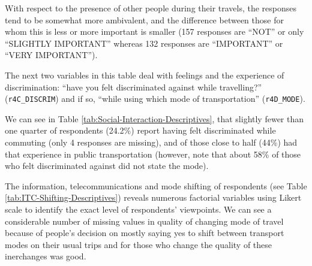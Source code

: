 \documentclass[
11pt, %
oneside, %
english, %
singlespacing, %
]{macthesis} %
\begin{document}
With respect to the presence of other people during their travels, the responses tend to be somewhat more ambivalent, and the difference between those for whom this is less or more important is smaller (157 responses are ``NOT'' or only ``SLIGHTLY IMPORTANT'' whereas 132 responses are ``IMPORTANT'' or ``VERY IMPORTANT'').

The next two variables in this table deal with feelings and the experience of discrimination: ``have you felt discriminated against while travelling?'' (\texttt{r4C\_DISCRIM}) and if so, ``while using which mode of transportation'' (\texttt{r4D\_MODE}).

We can see in Table \ref{tab:Social-Interaction-Descriptives}, that slightly fewer than one quarter of respondents (24.2\%) report having felt discriminated while commuting (only 4 responses are missing), and of those close to half (44\%) had that experience in public transportation (however, note that about 58\% of those who felt discriminated against did not state the mode).
\begin{table}

\caption{\label{tab:unnamed-chunk-11}\label{tab:Social-Interaction-Descriptives}Variables regarding social interactions of respondents}
\centering
{}
\end{table}
The information, telecommunications and mode shifting of respondents (see Table \ref{tab:ITC-Shifting-Descriptives}) reveals numerous factorial variables using Likert scale to identify the exact level of respondents' viewpoints. We can see a considerable number of missing values in quality of changing mode of travel because of people's decision on mostly saying yes to shift between transport modes on their usual trips and for those who change the quality of these inerchanges was good.
\end{document}
